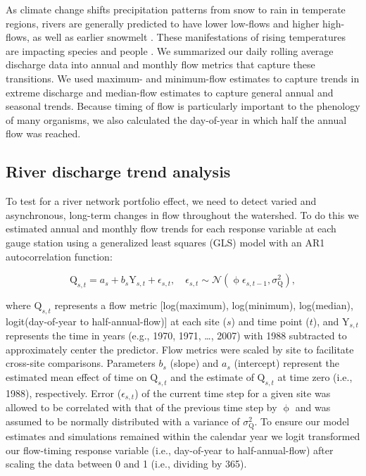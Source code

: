 \documentclass{AGUJournal}
\begin{document}
	As climate change shifts precipitation patterns from snow to rain in temperate regions, rivers are generally predicted to have lower low-flows and higher high-flows, as well as earlier snowmelt \citep{Nijssen:2001}. These manifestations of rising temperatures are impacting species \citep{Xenopoulos:2006} and people \citep{Hirabayashi:2013}. We summarized our daily rolling average discharge data into annual and monthly flow metrics that capture these transitions. We used maximum- and minimum-flow estimates to capture trends in extreme discharge and median-flow estimates to capture general annual and seasonal trends. Because timing of flow is particularly important to the phenology of many organisms, we also calculated the day-of-year in which half the annual flow was reached. 

\subsection{River discharge trend analysis}

To test for a river network portfolio effect, we need to detect varied and asynchronous, long-term changes in flow throughout the watershed. To do this we estimated annual and monthly flow trends for each response variable at each gauge station using a generalized least squares (GLS) model with an AR1 autocorrelation function:
\begin{linenomath*}
\begin{equation}
  \mathrm{Q}_{s,t} = a_s + b_s \mathrm{Y}_{s,t} + \epsilon_{s,t}, \quad 
  \epsilon_{s,t} \sim \mathcal{N}(\upphi \epsilon_{s,t-1}, \sigma_\mathrm{Q}^2) \label{eq1},
\end{equation}
\end{linenomath*}
where $\mathrm{Q}_{s,t}$ represents a flow metric [log(maximum), log(minimum), log(median), logit(day-of-year to half-annual-flow)] at each site ($s$) and time point ($t$), and $\mathrm{Y}_{s,t}$ represents the time in years (e.g., 1970, 1971, \ldots, 2007) with 1988 subtracted to approximately center the predictor. Flow metrics were scaled by site to facilitate cross-site comparisons. Parameters $b_{s}$ (slope) and $a_{s}$ (intercept) represent the estimated mean effect of time on $\mathrm{Q}_{s,t}$ and the estimate of $\mathrm{Q}_{s,t}$ at time zero (i.e., 1988), respectively. Error ($\epsilon_{s,t}$) of the current time step for a given site was allowed to be correlated with that of the previous time step by $\upphi$ and was assumed to be normally distributed with a variance of $\sigma_\mathrm{Q}^{2}$. To ensure our model estimates and simulations remained within the calendar year we logit transformed our flow-timing response variable (i.e., day-of-year to half-annual-flow) after scaling the data between 0 and 1 (i.e., dividing by 365).
\end{document}
